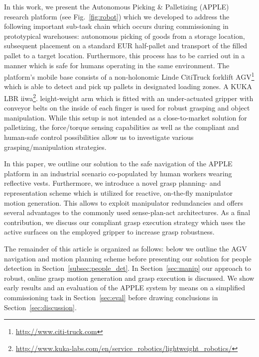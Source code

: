In this work, we present the Autonomous Picking \& Palletizing (APPLE) research platform (see
Fig.~\ref{fig:robot}) which we developed to address the following important sub-task chain which
occurs during commissioning in prototypical warehouses: autonomous picking of goods from a storage
location, subsequent placement on a standard EUR half-pallet and transport of the filled pallet to a
target location. Furthermore, this process has to be carried out in a manner which is safe for
humans operating in the same environment. The platform's mobile base consists of a non-holonomic
Linde CitiTruck forklift AGV\footnote{\url{ http://www.citi-truck.com}} which is able to detect and
pick up pallets in designated loading zones. A KUKA LBR
iiwa\footnote{\url{http://www.kuka-labs.com/en/service_robotics/lightweight_robotics/}}.
leight-weight arm which is fitted with an under-actuated gripper with conveyor belts on the inside
of each finger is used for robust grasping and object manipulation. While this setup is not intended
as a close-to-market solution for palletizing, the force/torque sensing capabilities as well as the
compliant and human-safe control possibilities allow us to investigate various grasping/manipulation
strategies.

  In this paper, we outline our solution to the safe navigation of the APPLE platform in
an industrial scenario co-populated by human workers wearing reflective vests. Furthermore, we
introduce a novel grasp planning- and representation scheme which is utilized for reactive,
on-the-fly manipulator motion generation. This allows to exploit manipulator redundancies and offers
several advantages to the commonly used sense-plan-act architectures. As a final contribution, we
discuss our compliant grasp execution strategy which uses the active surfaces on the employed
gripper to increase grasp robustness.

The remainder of this article is organized as follows: below we outline the AGV navigation and
motion planning scheme before presenting our solution for people detection in
Section~\ref{subsec:people_det}. In Section~\ref{sec:manip} our approach to robust, online grasp
motion generation and grasp execution is discussed. We show early results and an evaluation of the
APPLE system by means on a simplified commissioning task in Section~\ref{sec:eval} before drawing
conclusions in Section~\ref{sec:discussion}.
